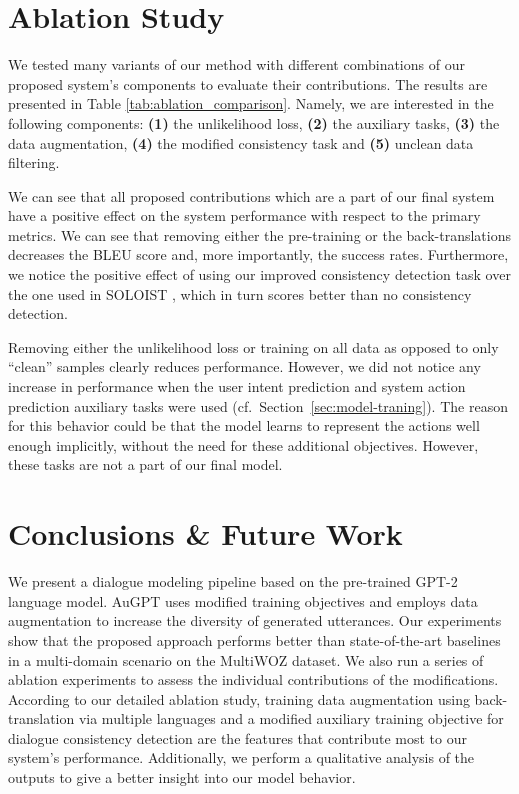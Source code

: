 \documentclass[11pt,a4paper]{article}
\newcommand{\Augpt}[0]{AuGPT\xspace}
\begin{document}
\section{Ablation Study}
We tested many variants of our method with different combinations of our proposed system's components to evaluate their contributions. The results are presented in Table \ref{tab:ablation_comparison}.
Namely, we are interested in the following components:
\textbf{(1)} the unlikelihood loss, \textbf{(2)} the auxiliary tasks, \textbf{(3)} the data augmentation, \textbf{(4)} the modified consistency task and \textbf{(5)} unclean data filtering.

We can see that all proposed contributions which are a part of our final system have a positive effect on the system performance with respect to the primary metrics.
We can see that removing either the pre-training or the back-translations decreases the BLEU score and, more importantly, the success rates. Furthermore, we notice the positive effect of using our improved consistency detection task over the one used in SOLOIST \cite{peng2020}, which in turn scores better than no consistency detection. 

Removing either the unlikelihood loss or training on all data as opposed to only “clean” samples clearly reduces performance.
However, we did not notice any increase in performance when the user intent prediction and system action prediction auxiliary tasks were used (cf.\ Section~\ref{sec:model-traning}).
The reason for this behavior could be that the model learns to represent the actions well enough implicitly, without the need for these additional objectives.
However, these tasks are not a part of our final model.



\section{Conclusions \& Future Work}
We present a dialogue modeling pipeline based on the pre-trained GPT-2 language model.
\Augpt uses modified training objectives and employs data augmentation to increase the diversity of generated utterances.
Our experiments show that the proposed approach performs better than state-of-the-art baselines in a multi-domain scenario on the MultiWOZ dataset.
We also run a series of ablation experiments to assess the individual contributions of the modifications.
According to our detailed ablation study, 
training data augmentation using back-translation via multiple languages and a modified auxiliary training objective for dialogue consistency detection are the features that contribute most to our system's performance.
Additionally, we perform a qualitative analysis of the outputs to give a better insight into our model behavior.
\end{document}
